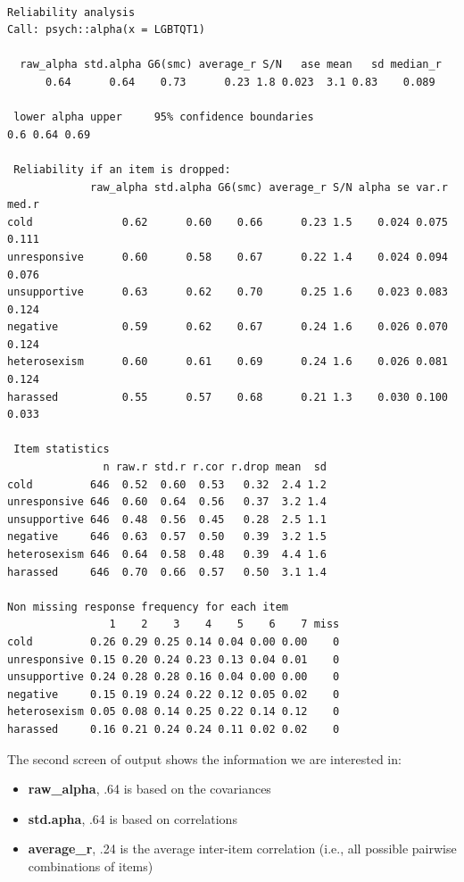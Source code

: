 \documentclass[
  english,
]{book}
\providecommand{\tightlist}{%
  \setlength{\itemsep}{0pt}\setlength{\parskip}{0pt}}
\begin{document}
\begin{verbatim}

Reliability analysis   
Call: psych::alpha(x = LGBTQT1)

  raw_alpha std.alpha G6(smc) average_r S/N   ase mean   sd median_r
      0.64      0.64    0.73      0.23 1.8 0.023  3.1 0.83    0.089

 lower alpha upper     95% confidence boundaries
0.6 0.64 0.69 

 Reliability if an item is dropped:
             raw_alpha std.alpha G6(smc) average_r S/N alpha se var.r med.r
cold              0.62      0.60    0.66      0.23 1.5    0.024 0.075 0.111
unresponsive      0.60      0.58    0.67      0.22 1.4    0.024 0.094 0.076
unsupportive      0.63      0.62    0.70      0.25 1.6    0.023 0.083 0.124
negative          0.59      0.62    0.67      0.24 1.6    0.026 0.070 0.124
heterosexism      0.60      0.61    0.69      0.24 1.6    0.026 0.081 0.124
harassed          0.55      0.57    0.68      0.21 1.3    0.030 0.100 0.033

 Item statistics 
               n raw.r std.r r.cor r.drop mean  sd
cold         646  0.52  0.60  0.53   0.32  2.4 1.2
unresponsive 646  0.60  0.64  0.56   0.37  3.2 1.4
unsupportive 646  0.48  0.56  0.45   0.28  2.5 1.1
negative     646  0.63  0.57  0.50   0.39  3.2 1.5
heterosexism 646  0.64  0.58  0.48   0.39  4.4 1.6
harassed     646  0.70  0.66  0.57   0.50  3.1 1.4

Non missing response frequency for each item
                1    2    3    4    5    6    7 miss
cold         0.26 0.29 0.25 0.14 0.04 0.00 0.00    0
unresponsive 0.15 0.20 0.24 0.23 0.13 0.04 0.01    0
unsupportive 0.24 0.28 0.28 0.16 0.04 0.00 0.00    0
negative     0.15 0.19 0.24 0.22 0.12 0.05 0.02    0
heterosexism 0.05 0.08 0.14 0.25 0.22 0.14 0.12    0
harassed     0.16 0.21 0.24 0.24 0.11 0.02 0.02    0
\end{verbatim}

The second screen of output shows the information we are interested in:

\begin{itemize}
\tightlist
\item
  \textbf{raw\_alpha}, .64 is based on the covariances
\item
  \textbf{std.apha}, .64 is based on correlations
\item
  \textbf{average\_r}, .24 is the average inter-item correlation (i.e., all possible pairwise combinations of items)
\end{itemize}
\end{document}
